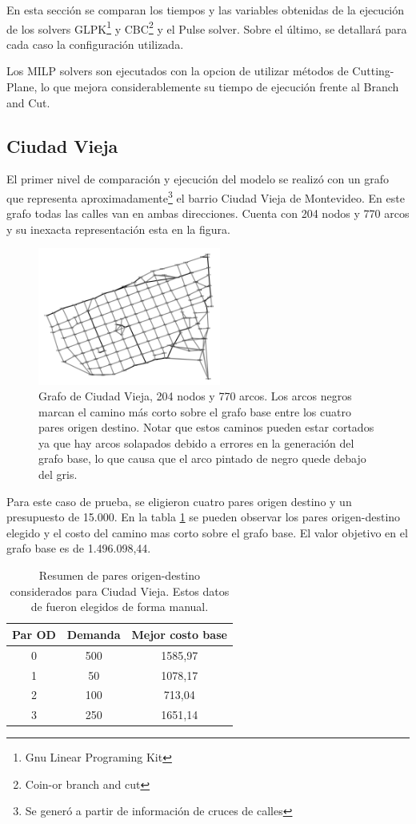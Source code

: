\documentclass{article}
\begin{document}
  En esta sección se comparan los tiempos y las variables obtenidas de la ejecución de los solvers GLPK\footnote{Gnu Linear Programing Kit} y CBC\footnote{Coin-or branch and cut} y el Pulse solver. Sobre el último, se detallará para cada caso la configuración utilizada.

  Los MILP solvers son ejecutados con la opcion de utilizar métodos de Cutting-Plane, lo que mejora considerablemente su tiempo de ejecución frente al Branch and Cut.

  \subsection*{Ciudad Vieja}

  El primer nivel de comparación y ejecución del modelo se realizó con un grafo que representa aproximadamente\footnote{Se generó a partir de información de cruces de calles} el barrio Ciudad Vieja de Montevideo. En este grafo todas las calles van en ambas direcciones. Cuenta con 204 nodos y 770 arcos y su inexacta representación esta en la figura.

  \begin{figure}[h!]
    \centering
    \includegraphics[width=6cm]{imgs/mdeo_med_base.png}
    \caption{Grafo de Ciudad Vieja, 204 nodos y 770 arcos. Los arcos negros marcan el camino más corto sobre el grafo base entre los cuatro pares origen destino. Notar que estos caminos pueden estar cortados ya que hay arcos solapados debido a errores en la generación del grafo base, lo que causa que el arco pintado de negro quede debajo del gris.}
    \label{ciudadvieja}
  \end{figure}

  Para este caso de prueba, se eligieron cuatro pares origen destino y un presupuesto de 15.000. En la tabla \ref{table:odsciudadvieja} se pueden observar los pares origen-destino elegido y el costo del camino mas corto sobre el grafo base. El valor objetivo en el grafo base es de 1.496.098,44.

  \begin{table}[h!]
    \centering
    \begin{tabular}{ccc}
      \toprule
      Par OD & Demanda & Mejor costo base \\
      \midrule
      0 & 500 & 1585,97 \\
      1 & 50 & 1078,17 \\
      2 & 100 & 713,04 \\
      3 & 250 & 1651,14 \\
      \bottomrule
    \end{tabular}
    \caption{Resumen de pares origen-destino considerados para Ciudad Vieja. Estos datos de fueron elegidos de forma manual.}\label{table:odsciudadvieja}
  \end{table}
  
\end{document}
